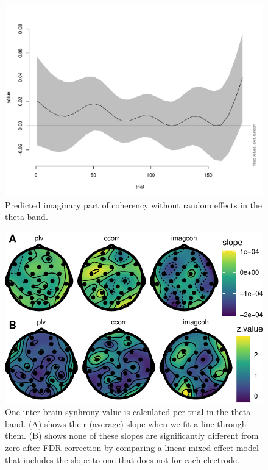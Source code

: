 \begin{figure}[!htpb]
  \includegraphics[width=\linewidth]{../stats/results/imagcoh-theta.pdf}
  \caption{Predicted imaginary part of coherency without random effects in the theta band.}
  \label{fig:imagcohtheta}
\end{figure}

\begin{figure}[!htpb]
  \includegraphics[width=\linewidth]{../stats/results/slopes_theta.pdf}
  \caption{One inter-brain synhrony value is calculated per trial in the theta band. (A) shows their (average) slope when we fit a line through them. (B) shows none of these slopes are significantly different from zero after FDR correction by comparing a linear mixed effect model that includes the slope to one that does not for each electrode.}
  \label{fig:slopes_theta}
\end{figure}


